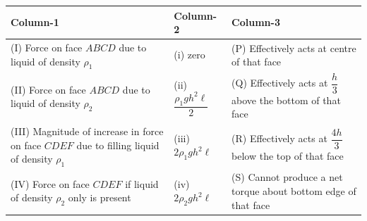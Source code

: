 \documentclass[10pt]{extarticle}
\begin{document}
\begin{center}\small\setlength{\tabcolsep}{4pt}
\begin{tabular}{|p{4.3cm}|p{3.6cm}|p{5.2cm}|}\hline
\textbf{Column-1} & \textbf{Column-2} & \textbf{Column-3}\\\hline
(I) Force on face $ABCD$ due to liquid of density $\rho_1$ & (i) zero & (P) Effectively acts at centre of that face\\\hline
(II) Force on face $ABCD$ due to liquid of density $\rho_2$ & (ii) $\dfrac{\rho_1gh^2\ell}{2}$ & (Q) Effectively acts at $\dfrac h3$ above the bottom of that face\\\hline
(III) Magnitude of increase in force on face $CDEF$ due to filling liquid of density $\rho_1$ & (iii) $2\rho_1gh^2\ell$ & (R) Effectively acts at $\dfrac{4h}{3}$ below the top of that face\\\hline
(IV) Force on face $CDEF$ if liquid of density $\rho_2$ only is present & (iv) $2\rho_2gh^2\ell$ & (S) Cannot produce a net torque about bottom edge of that face\\\hline
\end{tabular}
\end{center}
\end{document}
